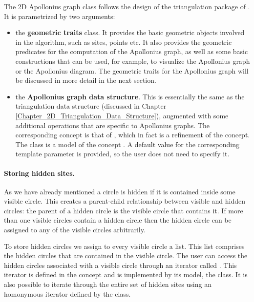 The 2D Apollonius graph class
follows the design of the triangulation package of \cgal. It is
parametrized by two arguments:
\begin{itemize}
\item the {\bf geometric traits} class. It provides the basic
  geometric objects involved in the algorithm, such as sites, points
  etc. It also provides the geometric predicates for the computation
  of the Apollonius graph, as well as some basic constructions that
  can be used, for example, to visualize the Apollonius graph or the
  Apollonius diagram. The geometric traits for the Apollonius graph
  will be discussed in more detail in the next section.
\item the {\bf Apollonius graph data structure}. This is essentially
  the same as the triangulation data structure (discussed in Chapter
  \ref{Chapter_2D_Triangulation_Data_Structure}), augmented with some
  additional operations that are specific to Apollonius graphs. The
  corresponding concept is that of
  , which in fact is a refinement
  of the  concept. The class
   is a model of
  the concept . A default value
  for the corresponding template parameter is provided, so the user
  does not need to specify it.
\end{itemize}

\paragraph{Storing hidden sites.}
As we have already mentioned a circle is hidden if it is contained
inside some visible circle. This creates a parent-child relationship
between visible and hidden circles: the parent of a hidden circle is the
visible circle that contains it. If more than one visible circles
contain a hidden circle then the hidden circle can be assigned to any of
the visible circles arbitrarily.

To store hidden circles we assign to every visible circle a list. This
list comprises the hidden circles that are contained in the
visible circle. The user can access the hidden circles associated with
a visible circle through an iterator called
. This iterator is defined in the
 concept and is implemented by its
model, the 
class. It is also possible to iterate through the entire set of hidden
sites using an homonymous iterator defined by the
 class. 

